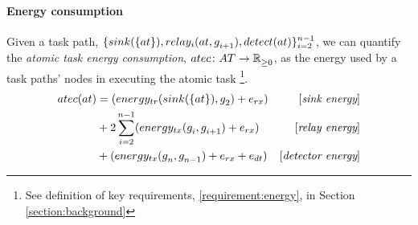 \paragraph{Energy consumption}
\label{section:energy_consumption}

Given a task path, $\lbrace \functionSinkRoleAtomic{}{}, \functionRelayRole{i}{i+1}, \functionDetectorRole{}{} \rbrace_{i=2}^{n-1}$, 
we can quantify the \textit{atomic task energy consumption}, $\formalAtomicTaskEnergyConsumption{}{}$, as the energy used by a task paths' nodes in executing the atomic task \footnote{See definition of key requirements, \ref{requirement:energy}, in Section \ref{section:background}}. 
\begin{equation}
\begin{aligned}
	\functionAtomicTaskEnergyConsumptionSignature{}{} 
	&= (\functionSignature{energy_{tr}}
		{\functionSinkRoleAtomic{}{},\varAgent{2}{}} + \varReceiverEnergy{}{}) & [\textit{sink energy}]\\
	&+ 2 \sum_{i=2}^{n-1} (\functionTransmissionEnergy{i}{i+1} + \varReceiverEnergy{}{})
	 & [\textit{relay energy}]\\
	&+ (
		\functionTransmissionEnergy{n}{n-1}
		+ \varReceiverEnergy{}{}
		+ \varSensorEnergy{}{}
		)& [\textit{detector energy}]
\end{aligned}
\end{equation}
